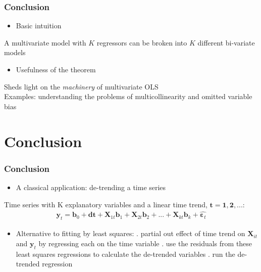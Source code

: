 \documentclass[xcolor=dvipsnames]{beamer}
\begin{document}
\begin{frame}\frametitle{Conclusion}
\begin{itemize}
    \item Basic intuition 
\end{itemize}
A multivariate model with $K$ regressors can be broken into $K$ different bi-variate models \\
\bigskip
\begin{itemize}
    \item Usefulness of the theorem \\
\end{itemize}
 Sheds light on the \textit{machinery} of multivariate OLS \\
 Examples: understanding the problems of multicollinearity and omitted variable bias

\end{frame}

\section{Conclusion}
\begin{frame}\frametitle{Conclusion}
\begin{itemize}
    \item A classical application: de-trending a time series  
\end{itemize}
Time series with K explanatory variables and a linear time trend, $\mathbf{t = 1, 2, ...}$:
\begin{align*}
\mathbf{y}_t =\mathbf{b}_0 + \mathbf{dt} + \mathbf{X}_{1t}\mathbf{b}_1+\mathbf{X}_{2t}\mathbf{b}_2+...+\mathbf{X}_{kt}\mathbf{b}_{k}+\hat{\boldsymbol{\varepsilon}_{t}}
\end{align*}
\begin{itemize}
    \item Alternative to fitting by least squares:
    . partial out effect of time trend on $\mathbf{X}_{it}$ and $\mathbf{y}_{t}$ by regressing each on the time variable
    . use the residuals from these least squares regressions to calculate the de-trended variables
    . run the de-trended regression 
\end{itemize}
\end{frame}
\end{document}
